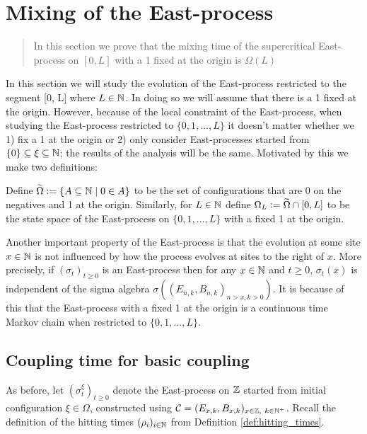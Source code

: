 \section{Mixing of the East-process}
\begin{quote}
{\small In this section we prove that the mixing time of the supercritical East-process on $[0, L]$ with a 1 fixed at the origin is $\Omega(L)$}
\end{quote}

In this section we will study the evolution of the East-process restricted to the segment [0, L] where $L \in \mathbb{N}$. In doing so we will assume that there is a 1 fixed at the origin. However, because of the local constraint of the East-process, when studying the East-process restricted to $\{0, 1, ..., L\}$ it doesn't matter whether we 1) fix a 1 at the origin or 2) only consider East-processes started from $\{0\} \subseteq \xi \subseteq \mathbb{N}$; the results of the analysis will be the same. Motivated by this we make two definitions:

\begin{definition}
Define $\widetilde{\Omega} \vcentcolon= \{A \subseteq \mathbb{N} \mid 0 \in A \}$ to be the set of configurations that are 0 on the negatives and 1 at the origin. Similarly, for $L \in \mathbb{N}$ define $\Omega_L \vcentcolon= \widetilde{\Omega} \cap [0, L]$ to be the state space of the East-process on $\{0, 1, ..., L\}$ with a fixed 1 at the origin. 
\end{definition}

Another important property of the East-process is that the evolution at some site $x \in \mathbb{N}$ is not influenced by how the process evolves at sites to the right of $x$. More precisely, if $(\sigma_t)_{t \geq 0}$ is an East-process then for any $x \in \mathbb{N}$ and $t \geq 0$, $\sigma_t (x)$ is independent of the sigma algebra $\sigma \left( (E_{n,k}, B_{n,k})_{n > x, k > 0}\right)$. It is because of this that the East-process with a fixed 1 at the origin is a continuous time Markov chain when restricted to $\{0, 1, ..., L\}$. 

\subsection{Coupling time for basic coupling}
As before, let $(\sigma^\xi_t)_{t \geq 0}$ denote the East-process on $\mathbb{Z}$ started from initial configuration $\xi \in \Omega$, constructed using $\mathcal{C} = (E_{x,k}, B_{x,k})_{x \in \mathbb{Z},\ k \in \mathbb{N}^+}$. Recall the definition of the hitting times $(\rho_i)_{i \in \mathbb{N}}$ from Definition \ref{def:hitting_times}.  


